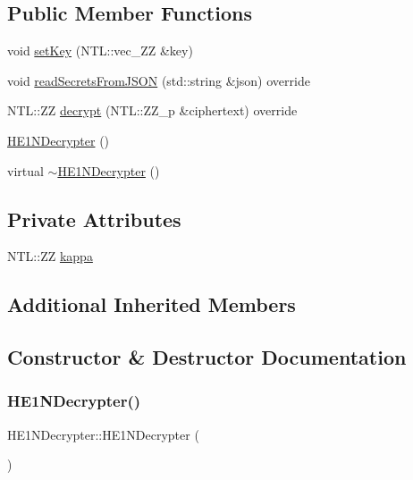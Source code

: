 \subsection*{Public Member Functions}
\begin{DoxyCompactItemize}
\item 
void \hyperlink{classHE1NDecrypter_a35a7d0c2ce869f417d6dc90792e61e11}{set\+Key} (N\+T\+L\+::vec\+\_\+\+ZZ \&key)
\item 
void \hyperlink{classHE1NDecrypter_a323f074a37cb4ebfbcfca4b6bdfb6737}{read\+Secrets\+From\+J\+S\+ON} (std\+::string \&json) override
\item 
N\+T\+L\+::\+ZZ \hyperlink{classHE1NDecrypter_a8e49ff8292a76884f328c566f4d1b646}{decrypt} (N\+T\+L\+::\+Z\+Z\+\_\+p \&ciphertext) override
\item 
\hyperlink{classHE1NDecrypter_a4aa5f1ecf0f7e0dcc3ea6e0073ac5e3a}{H\+E1\+N\+Decrypter} ()
\item 
virtual \hyperlink{classHE1NDecrypter_a46f33e40dfebb158ac2525ec04e244a9}{$\sim$\+H\+E1\+N\+Decrypter} ()
\end{DoxyCompactItemize}
\subsection*{Private Attributes}
\begin{DoxyCompactItemize}
\item 
N\+T\+L\+::\+ZZ \hyperlink{classHE1NDecrypter_a409fafa4eaf8d73998d6fee08ce4a8e2}{kappa}
\end{DoxyCompactItemize}
\subsection*{Additional Inherited Members}


\subsection{Constructor \& Destructor Documentation}
\mbox{\label{classHE1NDecrypter_a4aa5f1ecf0f7e0dcc3ea6e0073ac5e3a}} 
\subsubsection{\texorpdfstring{H\+E1\+N\+Decrypter()}{HE1NDecrypter()}}
{\footnotesize\ttfamily H\+E1\+N\+Decrypter\+::\+H\+E1\+N\+Decrypter (\begin{DoxyParamCaption}{ }\end{DoxyParamCaption})}

